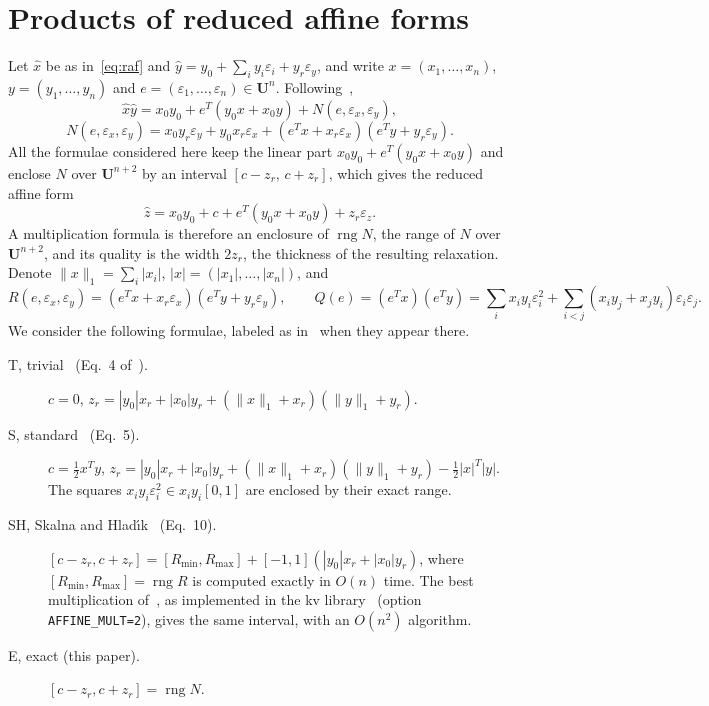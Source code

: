 \documentclass[11pt]{article}
\theoremstyle{definition}
\newcommand{\U}{\mathbf{U}}
\newcommand{\eps}{\varepsilon}
\newcommand{\ex}{\eps_x}
\newcommand{\ey}{\eps_y}
\newcommand{\rng}{\operatorname{rng}}
\begin{document}
\section{Products of reduced affine forms}
\label{sec:products}

Let $\hat x$ be as in~\eqref{eq:raf} and $\hat y = y_0+\sum_i y_i\eps_i + y_r\ey$, and write $x=(x_1,\dots,x_n)$, $y=(y_1,\dots,y_n)$ and $e=(\eps_1,\dots,\eps_n)\in\U^n$. Following~\cite{skalna2017new},
\begin{equation}
\label{eq:product}
\hat x\hat y = x_0y_0 + e^T(y_0x+x_0y) + N(e,\ex,\ey),
\end{equation}
\begin{equation}
\label{eq:N}
N(e,\ex,\ey) = x_0y_r\ey + y_0x_r\ex + (e^Tx + x_r\ex)(e^Ty + y_r\ey).
\end{equation}
All the formulae considered here keep the linear part $x_0y_0+e^T(y_0x+x_0y)$ and enclose $N$ over $\U^{n+2}$ by an interval $[c-z_r,\,c+z_r]$, which gives the reduced affine form
\begin{equation}
\label{eq:zhat}
\hat z = x_0y_0 + c + e^T(y_0x+x_0y) + z_r\eps_z .
\end{equation}
A multiplication formula is therefore an enclosure of $\rng N$, the range of $N$ over $\U^{n+2}$, and its quality is the width $2z_r$, the thickness of the resulting relaxation. Denote $\|x\|_1=\sum_i|x_i|$, $|x|=(|x_1|,\dots,|x_n|)$, and
\[
R(e,\ex,\ey) = (e^Tx + x_r\ex)(e^Ty + y_r\ey), \qquad Q(e) = (e^Tx)(e^Ty) = \sum_i x_iy_i\eps_i^2 + \sum_{i<j}(x_iy_j+x_jy_i)\eps_i\eps_j .
\]
We consider the following formulae, labeled as in~\cite{skalna2017new} when they appear there.
\begin{description}
\item[T, trivial~\cite{stolfi1997self} (Eq.~4 of~\cite{skalna2017new}).] $c=0$, $z_r = |y_0|x_r+|x_0|y_r+(\|x\|_1+x_r)(\|y\|_1+y_r)$.
\item[S, standard~\cite{kolev2004improved,vu2009enhancing} (Eq.~5).] $c=\tfrac12 x^Ty$, $z_r = |y_0|x_r+|x_0|y_r+(\|x\|_1+x_r)(\|y\|_1+y_r) - \tfrac12|x|^T|y|$. The squares $x_iy_i\eps_i^2\in x_iy_i[0,1]$ are enclosed by their exact range.
\item[SH, Skalna and Hlad\'{\i}k~\cite{skalna2017new} (Eq.~10).] $[c-z_r,c+z_r] = [R_{\min},R_{\max}] + [-1,1](|y_0|x_r+|x_0|y_r)$, where $[R_{\min},R_{\max}]=\rng R$ is computed exactly in $O(n)$ time. The best multiplication of~\cite{miyajima2003best}, as implemented in the kv library~\cite{kvlib} (option \texttt{AFFINE\_MULT=2}), gives the same interval, with an $O(n^2)$ algorithm.
\item[E, exact (this paper).] $[c-z_r,c+z_r]=\rng N$.
\end{description}
\end{document}
